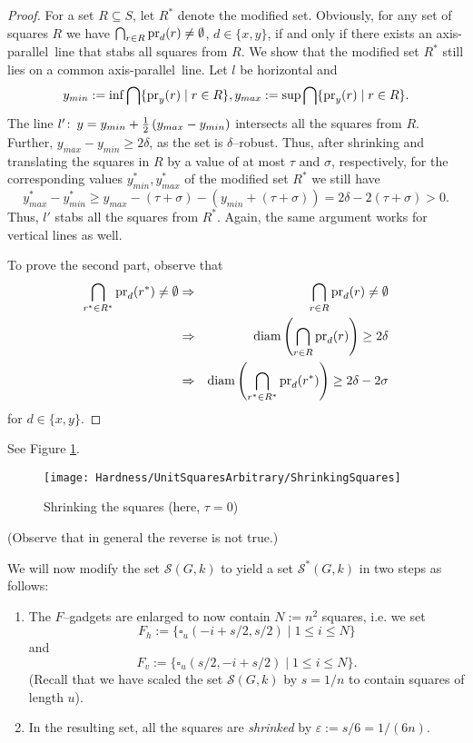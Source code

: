 \documentclass[12pt]{article}
\newcommand{\eps}{\varepsilon}
\newcommand{\co}{\colon\thinspace}
\newcommand{\ap}{a.p.\ }
\renewcommand{\ap}{axis-parallel\ }
\newcommand{\calS}{\mathcal{S}}
\newcommand{\diam}{\operatorname{diam}}
\newcommand{\follows}{\Rightarrow}
\begin{document}
\begin{proof} For a set $R \subseteq S$, let $R^*$ denote the modified set. Obviously, for any set of squares $R$ we have $\bigcap_{r \in R}\operatorname{pr}_d(r) \neq \emptyset$, $d \in \{x, y\}$, if and only if there exists an \ap line that stabs all squares from $R$. We show that the modified set $R^*$ still lies on a common \ap line. Let $l$ be horizontal and 
\[ y_{min} := \inf \bigcap \{ \operatorname{pr}_y(r) \mid r \in R \}, y_{max} :=  \sup \bigcap \{ \operatorname{pr}_y(r) \mid r \in R \}. \] 
The line $l'\co y = y_{min} + \frac{1}{2}\left(y_{max} - y_{min}\right)$ intersects all the squares from $R$. Further, $y_{max} - y_{min} \geq 2\delta$, as the set is $\delta$--robust. Thus, after shrinking and translating the squares in $R$ by a value of at most $\tau$ and $\sigma$, respectively, for the corresponding values $y_{min}^*, y_{max}^*$ of the modified set $R^*$ we still have 
\[ y_{max}^* - y_{min}^* \geq y_{max} - (\tau + \sigma) - \left(y_{min} + (\tau + \sigma) \right) = 2\delta - 2(\tau + \sigma) > 0. \]
Thus, $l'$ stabs all the squares from $R^*$.
Again, the same argument works for vertical lines as well.

To prove the second part, observe that 
\begin{eqnarray*} \bigcap_{r^* \in R^*}\pr_d(r^*) \neq \emptyset & \follows & \bigcap_{r \in R}\pr_d(r) \neq \emptyset\\
& \follows & \diam\left(\bigcap_{r \in R}\pr_d(r)\right) \geq 2\delta\\
& \follows & \diam\left(\bigcap_{r^* \in R^*}\pr_d(r^*)\right) \geq 2\delta - 2\sigma
\end{eqnarray*}
for $d \in \{x, y\}.$

\end{proof}
See Figure \ref{fig:ShrinkingSquares}.
\begin{figure}[ht]
	\centering
		\texttt{[image: Hardness/UnitSquaresArbitrary/ShrinkingSquares]}
	\caption{Shrinking the squares (here, $\tau = 0$)}
	\label{fig:ShrinkingSquares}
\end{figure}
(Observe that in general the reverse is not true.)

We will now modify the set $\calS(G, k)$ to yield a set $\calS^*(G, k)$ in two steps as follows:
\begin{enumerate}
	\item The $F$--gadgets are enlarged to now contain $N := n^2$ squares, i.e. we set
	\[ F_h := \{ \square_u(-i + s/2, s/2) \mid 1 \leq i \leq N \} \]
	and
	\[ F_v := \{ \square_u(s/2, -i + s/2) \mid 1 \leq i \leq N \}.\]
        (Recall that we have scaled the set $\calS(G, k)$ by $s = 1/n$ to contain squares of length $u$).
	\item In the resulting set, all the squares are \emph{shrinked} by $\eps := s/6 = 1/(6n)$.
\end{enumerate}
\end{document}
